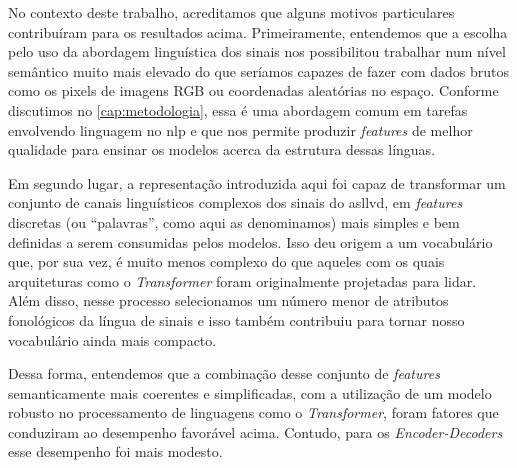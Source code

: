 No contexto deste trabalho, acreditamos que alguns motivos particulares contribuíram para os resultados acima.
Primeiramente, entendemos que a escolha pelo uso da abordagem linguística dos sinais nos possibilitou trabalhar num nível semântico muito mais elevado do que seríamos capazes de fazer com dados brutos como os pixels de imagens RGB ou coordenadas aleatórias no espaço. Conforme discutimos no \autoref{cap:metodologia}, essa é uma abordagem comum em tarefas envolvendo linguagem no \acrshort{nlp} e que nos permite produzir \textit{features} de melhor qualidade para ensinar os modelos acerca da estrutura dessas línguas.

Em segundo lugar, a representação introduzida aqui foi capaz de transformar um conjunto de canais linguísticos complexos dos sinais do \acrshort{asllvd}, em \textit{features} discretas (ou ``palavras'', como aqui as denominamos) mais simples e bem definidas a serem consumidas pelos modelos.
Isso deu origem a um vocabulário que, por sua vez, é muito menos complexo do que aqueles com os quais arquiteturas como o \textit{Transformer} foram originalmente projetadas para lidar. Além disso, nesse processo selecionamos um número menor de atributos fonológicos da língua de sinais e isso também contribuiu para tornar nosso vocabulário ainda mais compacto.

Dessa forma, entendemos que a combinação desse conjunto de \textit{features} semanticamente mais coerentes e simplificadas, com a utilização de um modelo robusto no processamento de linguagens como o \textit{Transformer}, foram fatores que conduziram ao desempenho favorável acima.
Contudo, para os \textit{Encoder-Decoders} esse desempenho foi mais modesto.












